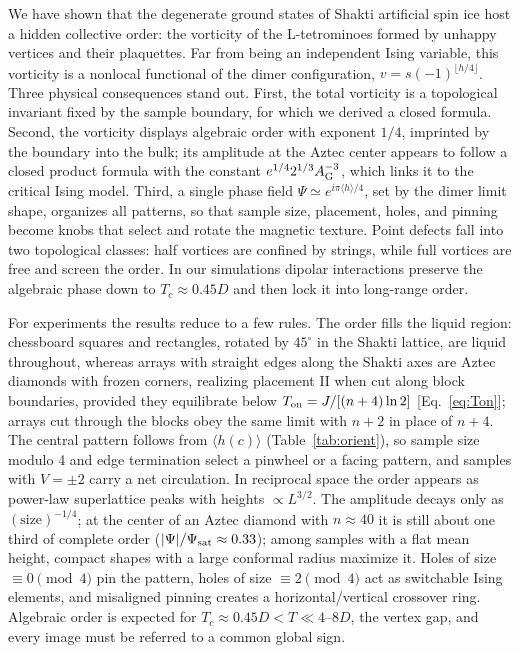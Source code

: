 \documentclass[aps,prb,twocolumn,floatfix,longbibliography]{revtex4-2}
\newcommand{\floor}[1]{\lfloor #1\rfloor}
\begin{document}
We have shown that the degenerate ground states of Shakti artificial spin ice host a hidden collective order: the vorticity of the L-tetrominoes formed by unhappy vertices and their plaquettes. Far from being an independent Ising variable, this vorticity is a nonlocal functional of the dimer configuration, $v=s(-1)^{\floor{h/4}}$. Three physical consequences stand out. First, the total vorticity is a topological invariant fixed by the sample boundary, for which we derived a closed formula. Second, the vorticity displays algebraic order with exponent $1/4$, imprinted by the boundary into the bulk; its amplitude at the Aztec center appears to follow a closed product formula with the constant $e^{1/4}2^{1/3}A_{\rm G}^{-3}$, which links it to the critical Ising model. Third, a single phase field $\Psi\simeq e^{i\pi\langle h\rangle/4}$, set by the dimer limit shape, organizes all patterns, so that sample size, placement, holes, and pinning become knobs that select and rotate the magnetic texture. Point defects fall into two topological classes: half vortices are confined by strings, while full vortices are free and screen the order. In our simulations dipolar interactions preserve the algebraic phase down to $T_c\approx0.45D$ and then lock it into long-range order.

For experiments the results reduce to a few rules. The order fills the liquid region: chessboard squares and rectangles, rotated by $45^\circ$ in the Shakti lattice, are liquid throughout, whereas arrays with straight edges along the Shakti axes are Aztec diamonds with frozen corners, realizing placement II when cut along block boundaries, provided they equilibrate below $T_{\rm on}=J/[(n+4)\ln2]$ [Eq.~\eqref{eq:Ton}]; arrays cut through the blocks obey the same limit with $n+2$ in place of $n+4$. The central pattern follows from $\langle h(c)\rangle$ (Table~\ref{tab:orient}), so sample size modulo 4 and edge termination select a pinwheel or a facing pattern, and samples with $V=\pm2$ carry a net circulation. In reciprocal space the order appears as power-law superlattice peaks with heights $\propto L^{3/2}$. The amplitude decays only as $(\text{size})^{-1/4}$; at the center of an Aztec diamond with $n\approx40$ it is still about one third of complete order ($|\Psi|/\Psi_{\rm sat}\approx0.33$); among samples with a flat mean height, compact shapes with a large conformal radius maximize it. Holes of size $\equiv0\pmod4$ pin the pattern, holes of size $\equiv2\pmod4$ act as switchable Ising elements, and misaligned pinning creates a horizontal/vertical crossover ring. Algebraic order is expected for $T_c\approx0.45D<T\ll4$--$8D$, the vertex gap, and every image must be referred to a common global sign.
\end{document}
